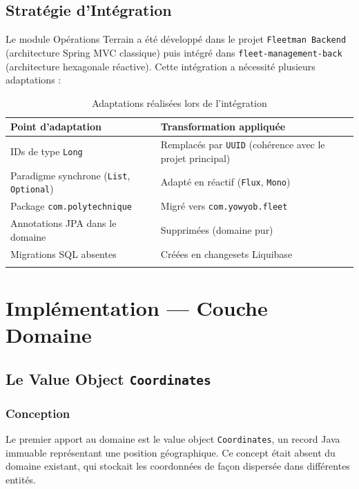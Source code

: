 \documentclass[12pt,a4paper]{report}
\begin{document}
\section{Stratégie d'Intégration}

Le module Opérations Terrain a été développé dans le projet \texttt{Fleetman Backend} (architecture Spring MVC classique) puis intégré dans \texttt{fleet-management-back} (architecture hexagonale réactive). Cette intégration a nécessité plusieurs adaptations :

\begin{longtable}{p{5cm}p{8cm}}
\toprule
\textbf{Point d'adaptation} & \textbf{Transformation appliquée} \\
\midrule
\endhead
IDs de type \texttt{Long} & Remplacés par \texttt{UUID} (cohérence avec le projet principal) \\
Paradigme synchrone (\texttt{List}, \texttt{Optional}) & Adapté en réactif (\texttt{Flux}, \texttt{Mono}) \\
Package \texttt{com.polytechnique} & Migré vers \texttt{com.yowyob.fleet} \\
Annotations JPA dans le domaine & Supprimées (domaine pur) \\
Migrations SQL absentes & Créées en changesets Liquibase \\
\bottomrule
\caption{Adaptations réalisées lors de l'intégration}
\end{longtable}

\chapter{Implémentation — Couche Domaine}

\section{Le Value Object \texttt{Coordinates}}

\subsection{Conception}

Le premier apport au domaine est le value object \texttt{Coordinates}, un record Java immuable représentant une position géographique. Ce concept était absent du domaine existant, qui stockait les coordonnées de façon dispersée dans différentes entités.
\end{document}
